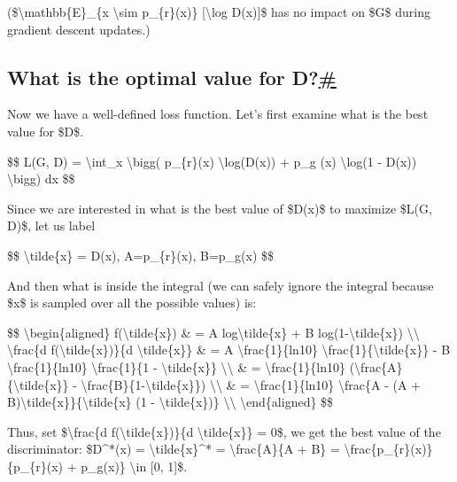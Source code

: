 (\$\textbackslash mathbb\{E\}\_\{x \textbackslash sim p\_\{r\}(x)\} {[}\textbackslash log D(x){]}\$ has no impact on \$G\$ during gradient descent updates.)

\subsection{\texorpdfstring{What is the optimal value for D?\hyperref[what-is-the-optimal-value-for-d]{\#}}{What is the optimal value for D?\#}}\label{what-is-the-optimal-value-for-d}

Now we have a well-defined loss function. Let's first examine what is the best value for \$D\$.

\$\$ L(G, D) = \textbackslash int\_x \textbackslash bigg( p\_\{r\}(x) \textbackslash log(D(x)) + p\_g (x) \textbackslash log(1 - D(x)) \textbackslash bigg) dx \$\$

Since we are interested in what is the best value of \$D(x)\$ to maximize \$L(G, D)\$, let us label

\$\$ \textbackslash tilde\{x\} = D(x), A=p\_\{r\}(x), B=p\_g(x) \$\$

And then what is inside the integral (we can safely ignore the integral because \$x\$ is sampled over all the possible values) is:

\$\$ \textbackslash begin\{aligned\} f(\textbackslash tilde\{x\}) \& = A log\textbackslash tilde\{x\} + B log(1-\textbackslash tilde\{x\}) \textbackslash\textbackslash{} \textbackslash frac\{d f(\textbackslash tilde\{x\})\}\{d \textbackslash tilde\{x\}\} \& = A \textbackslash frac\{1\}\{ln10\} \textbackslash frac\{1\}\{\textbackslash tilde\{x\}\} - B \textbackslash frac\{1\}\{ln10\} \textbackslash frac\{1\}\{1 - \textbackslash tilde\{x\}\} \textbackslash\textbackslash{} \& = \textbackslash frac\{1\}\{ln10\} (\textbackslash frac\{A\}\{\textbackslash tilde\{x\}\} - \textbackslash frac\{B\}\{1-\textbackslash tilde\{x\}\}) \textbackslash\textbackslash{} \& = \textbackslash frac\{1\}\{ln10\} \textbackslash frac\{A - (A + B)\textbackslash tilde\{x\}\}\{\textbackslash tilde\{x\} (1 - \textbackslash tilde\{x\})\} \textbackslash\textbackslash{} \textbackslash end\{aligned\} \$\$

Thus, set \$\textbackslash frac\{d f(\textbackslash tilde\{x\})\}\{d \textbackslash tilde\{x\}\} = 0\$, we get the best value of the discriminator: \$D\^{}*(x) = \textbackslash tilde\{x\}\^{}* = \textbackslash frac\{A\}\{A + B\} = \textbackslash frac\{p\_\{r\}(x)\}\{p\_\{r\}(x) + p\_g(x)\} \textbackslash in {[}0, 1{]}\$.

